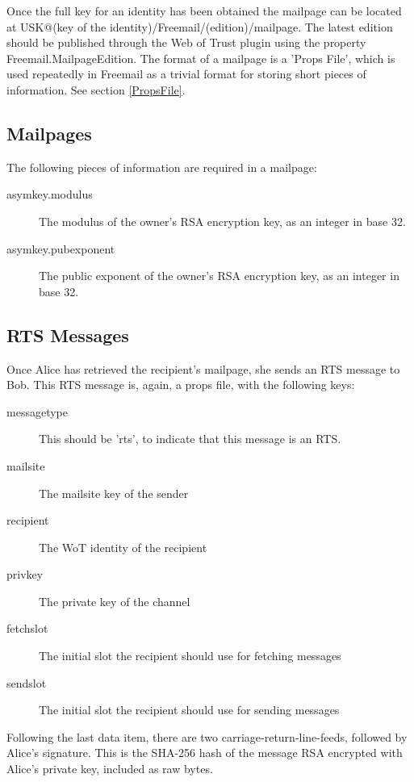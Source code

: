 \documentclass[12pt,a4paper]{article}
\begin{document}
Once the full key for an identity has been obtained the mailpage can be located at
USK@(key of the identity)/Freemail/(edition)/mailpage. The latest edition should be published
through the Web of Trust plugin using the property Freemail.MailpageEdition. The format of a
mailpage is a 'Props File', which is used repeatedly in Freemail as a trivial format for storing
short pieces of information. See section \ref{PropsFile}.

\subsection{Mailpages}
The following pieces of information are required in a mailpage:

\begin{description}
\item[asymkey.modulus] The modulus of the owner's RSA encryption key, as an integer in base 32.
\item[asymkey.pubexponent] The public exponent of the owner's RSA encryption key, as an integer in
	base 32.
\end{description}

\subsection{RTS Messages}
Once Alice has retrieved the recipient's mailpage, she sends an RTS message to Bob. This RTS message
is, again, a props file, with the following keys:

\begin{description}
\item[messagetype] This should be 'rts', to indicate that this message is an RTS.
\item[mailsite] The mailsite key of the sender
\item[recipient] The WoT identity of the recipient
\item[privkey] The private key of the channel
\item[fetchslot] The initial slot the recipient should use for fetching messages
\item[sendslot] The initial slot the recipient should use for sending messages
\end{description}

Following the last data item, there are two carriage-return-line-feeds, followed by Alice's
signature. This is the SHA-256 hash of the message RSA encrypted with Alice's private key, included
as raw bytes.
\end{document}
